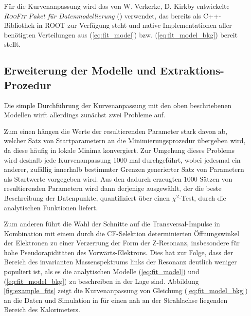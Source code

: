 Für die Kurvenanpassung wird das von W. Verkerke, D. Kirkby entwickelte
\textit{\textsc{RooFit} Paket für Datenmodellierung} (\cite{Verkerke:2003ir})
verwendet, das bereits als \textsc{C++}-Bibliothek in \textsc{ROOT} zur
Verfügung steht und native Implementationen aller benötigten Verteilungen aus
(\ref{eq:fit_model}) bzw. (\ref{eq:fit_model_bkg}) bereit stellt.



\subsection{Erweiterung der Modelle und Extraktions-Prozedur}
\label{energy_calibration:erweiterung_der_modelle_und_prozedur}
Die simple Durchführung der Kurvenanpassung mit den oben beschriebenen Modellen
wirft allerdings zunächst zwei Probleme auf.

Zum einen hängen die Werte der resultierenden Parameter stark davon ab, welcher
Satz von Startparametern an die Minimierungsprozedur übergeben wird, da diese
häufig in lokale Minima konvergiert. Zur
Umgehung dieses Problems wird deshalb jede Kurvenanpassung 1000 mal
durchgeführt, wobei jedesmal ein anderer, zufällig innerhalb bestimmter Grenzen
generierter Satz von Parametern als Startwerte vorgegeben wird. Aus den dadurch
erzeugten 1000 Sätzen von resultierenden Parametern wird dann derjenige
ausgewählt, der die beste Beschreibung der Datenpunkte, quantifiziert über
einen $\chi^2$-Test, durch die analytischen Funktionen liefert.

Zum anderen führt die Wahl der Schnitte auf die Transversal-Impulse in
Kombination mit einem durch die \ac{CF}-Selektion determinierten Öffnungswinkel
der Elektronen zu einer Verzerrung der Form der Z-Resonanz, insbesondere für
hohe Pseudorapiditäten des Vorwärts-Elektrons. Dies hat zur Folge, dass der
Bereich des invarianten Massenspektrums links der Resonanz deutlich weniger
populiert ist, als es die analytischen Modelle (\ref{eq:fit_model}) und
(\ref{eq:fit_model_bkg}) zu beschreiben in der Lage sind. Abbildung
\ref{fig:example_fits} zeigt die Kurvenanpassung von Gleichung
(\ref{eq:fit_model_bkg}) an die Daten und Simulation in für einen nah an der
Strahlachse liegenden Bereich des Kalorimeters.

